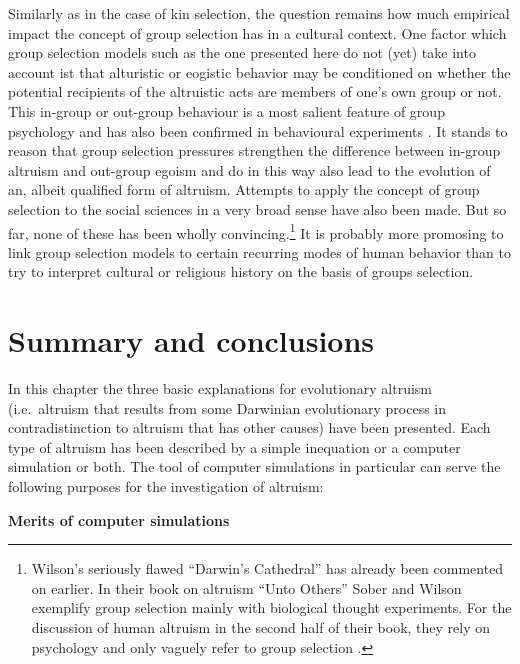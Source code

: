 Similarly as in the case of kin selection, the question remains how much
empirical impact the concept of group selection has in a cultural context.
One factor which group selection models such as the one presented here do not (yet) take 
into account ist that alturistic or eogistic behavior may be conditioned on whether the 
potential recipients of the altruistic acts are members of one's own group or not. 
This in-group or out-group behaviour is a most salient feature of group psychology and has
also been confirmed in behavioural experiments \cite[]{bernhard-fischbacher-fehr:2006}. 
It stands to reason that group selection pressures strengthen the difference between in-group 
altruism and out-group egoism and do in this way also lead to the evolution of an, 
albeit qualified form of altruism.
Attempts to apply the concept of group selection to the social sciences in a very broad sense have also
been made. But so far, none of these has been wholly
convincing.\footnote{Wilson's seriously flawed ``Darwin's Cathedral''
  \cite[]{wilson:2002} has already been commented on earlier. In their book on
  altruism ``Unto Others'' \cite[]{sober-wilson:1998} Sober and Wilson
  exemplify group selection mainly with biological thought experiments. For
  the discussion of human altruism in the second half of their book, they rely
  on psychology and only vaguely refer to group selection
\cite[p.\ 296ff., p.\ 345ff.]{sober-wilson:1998}.} It is probably more promosing to link group selection models to certain recurring modes of human behavior than to try to interpret cultural or religious history on the basis of groups selection.

\section{Summary and conclusions}
\label{summarySimulations}
In this chapter the three basic explanations for evolutionary altruism (i.e.\ 
altruism that results from some Darwinian evolutionary process in
contradistinction to altruism that has other causes) have been presented. Each
type of altruism has been described by a simple inequation or a computer
simulation or both. The tool of computer simulations in particular can serve
the following purposes for the investigation of altruism:

\vspace{1cm}
\begin{center}{\bf Merits of computer simulations}\end{center}


